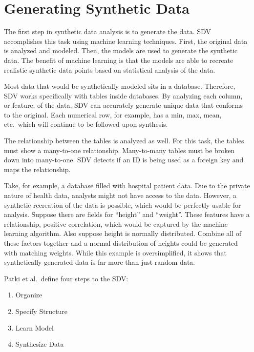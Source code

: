 \section{Generating Synthetic Data}

The first step in synthetic data analysis is to generate the data. SDV
accomplishes this task using machine learning techniques. First, the original
data is analyzed and modeled. Then, the models are used to generate the
synthetic data. The benefit of machine learning is that the models are able
to recreate realistic synthetic data points based on statistical analysis
of the data.\cite{patki-wedge-veer-sdv}

Most data that would be synthetically modeled sits in a database. Therefore,
SDV works specifically with tables inside databases. By analyzing each column,
or feature, of the data, SDV can accurately generate unique data that conforms
to the original. Each numerical row, for example, has a min, max, mean, etc.\
which will continue to be followed upon synthesis.\cite{patki-wedge-veer-sdv}

The relationship between the tables is analyzed as well. For this task,
the tables must show a many-to-one relationship. Many-to-many tables must
be broken down into many-to-one. SDV detects if an ID is being used as a
foreign key and maps the relationship.\cite{patki-sdv}

Take, for example, a database filled with hospital patient data. Due to
the private nature of health data, analysts might not have access to the
data. However, a synthetic recreation of the data is possible, which would be
perfectly usable for analysis. Suppose there are fields for ``height'' and
``weight''. These features have a relationship, positive correlation, which
would be captured by the machine learning algorithm. Also suppose height is
normally distributed. Combine all of these factors together and a normal
distribution of heights could be generated with matching weights. While
this example is oversimplified, it shows that synthetically-generated data
is far more than just random data.\cite{patki-wedge-veer-sdv}

Patki et al.\ define four steps to the SDV\cite{patki-wedge-veer-sdv}:
\begin{enumerate}
    \item Organize
    \item Specify Structure
    \item Learn Model
    \item Synthesize Data
\end{enumerate}

